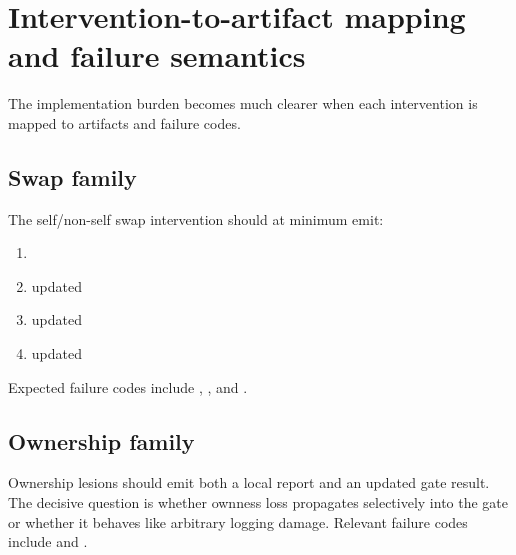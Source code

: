 \documentclass[11pt,a4paper]{article}
\theoremstyle{definition}
\begin{document}
\section{Intervention-to-artifact mapping and failure semantics}
The implementation burden becomes much clearer when each intervention is mapped to artifacts and failure codes.

\subsection{Swap family}
The self/non-self swap intervention should at minimum emit:
\begin{enumerate}[leftmargin=1.5em]
\item \texttt{\allowbreak{}\allowbreak{}\allowbreak{}}
\item updated \texttt{\allowbreak{}\allowbreak{}}
\item updated \texttt{\allowbreak{}\allowbreak{}\allowbreak{}\allowbreak{}}
\item updated \texttt{\allowbreak{}\allowbreak{}\allowbreak{}\allowbreak{}}
\end{enumerate}
Expected failure codes include \texttt{\allowbreak{}\allowbreak{}}, \texttt{\allowbreak{}\allowbreak{}}, and \texttt{\allowbreak{}\allowbreak{}}.

\subsection{Ownership family}
Ownership lesions should emit both a local report and an updated gate result. The decisive question is whether ownness loss propagates selectively into the gate or whether it behaves like arbitrary logging damage. Relevant failure codes include \texttt{\allowbreak{}\allowbreak{}\allowbreak{}} and \texttt{\allowbreak{}\allowbreak{}}.
\end{document}
